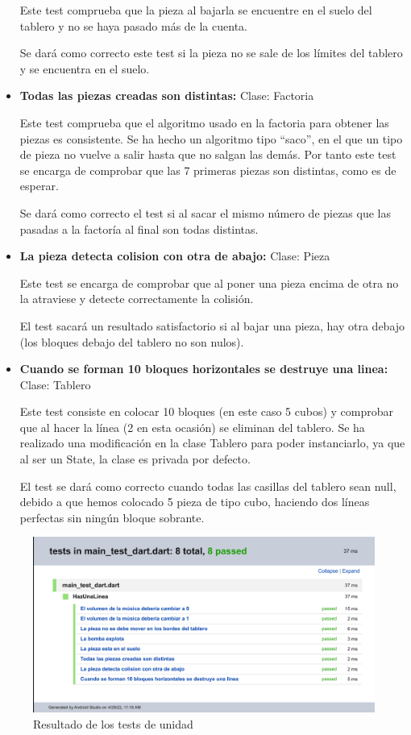 \documentclass{article}
\begin{document}
\begin{itemize}
Este test comprueba que la pieza al bajarla se encuentre en el suelo del tablero y no se haya pasado más de la cuenta.

Se dará como correcto este test si la pieza no se sale de los límites del tablero y se encuentra en el suelo.

\item \textbf{Todas las piezas creadas son distintas:} Clase: Factoria

Este test comprueba que el algoritmo usado en la factoria para obtener las piezas es consistente. Se ha hecho un algoritmo tipo ``saco'', en el que un tipo de pieza no vuelve a salir hasta que no salgan las demás. Por tanto este test se encarga de comprobar que las 7 primeras piezas son distintas, como es de esperar.

Se dará como correcto el test si al sacar el mismo número de piezas que las pasadas a la factoría al final son todas distintas.

\item \textbf{La pieza detecta colision con otra de abajo:} Clase: Pieza

Este test se encarga de comprobar que al poner una pieza encima de otra no la atraviese y detecte correctamente la colisión.

El test sacará un resultado satisfactorio si al bajar una pieza, hay otra debajo (los bloques debajo del tablero no son nulos).

\item \textbf{Cuando se forman 10 bloques horizontales se destruye una linea:} Clase: Tablero

Este test consiste en colocar 10 bloques (en este caso 5 cubos) y comprobar que al hacer la línea (2 en esta ocasión) se eliminan del tablero. Se ha realizado una modificación
en la clase Tablero para poder instanciarlo, ya que al ser un State, la clase es privada por defecto.

El test se dará como correcto cuando todas las casillas del tablero sean null, debido a que hemos colocado 5 pieza de tipo cubo, haciendo dos líneas perfectas sin ningún bloque sobrante.
\end{itemize}

\begin{figure}[H]
      \includegraphics[width=\textwidth]{imagenes/dart_test.png}
      \caption{Resultado de los tests de unidad}
\end{figure}
\end{document}
